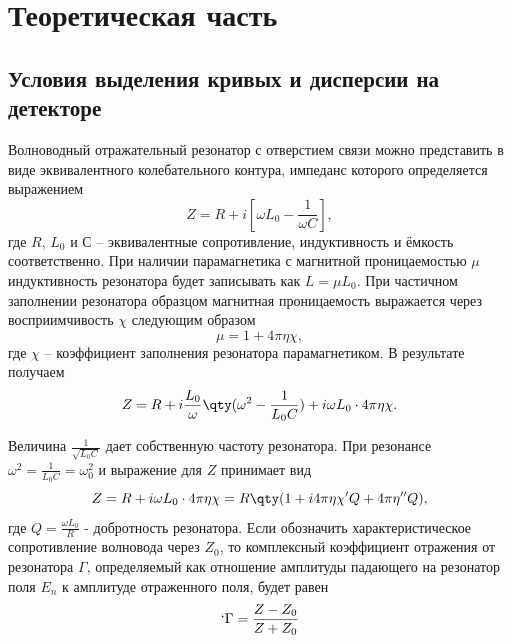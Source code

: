 

\def\labauthors{Виноградов И.Д., Понур К.А., Шиков А.П.}
\def\labgroup{440}
\def\labnumber{1}
\def\labtheme{Исследование твердотельных структур методом ЭПР-спектроскопии}
\def\department{Кафедра квантовой радиофизики и электроники}

\newpage
\section{Теоретическая часть}%
\subsection{Условия выделения кривых и дисперсии на детекторе}%


Волноводный отражательный резонатор с отверстием связи можно представить в виде эквивалентного колебательного контура, импеданс которого определяется выражением
\begin{equation}
    \label{eq:1}
    Z = R + i [ \omega L_{0} - \frac{1}{\omega C}],
\end{equation}
где $R$, $L_{0}$ и $С$ -- эквивалентные сопротивление, индуктивность и ёмкость соответственно. При наличии парамагнетика с магнитной проницаемостью  $\mu$ индуктивность резонатора будет записывать как $L = \mu L_{0}$. При частичном заполнении резонатора образцом магнитная проницаемость выражается через восприимчивость $\chi$ следующим образом
\begin{equation}
    \label{eq:2}
    \mu = 1 + 4 \pi \eta \chi,
\end{equation}
где $\chi$ -- коэффициент заполнения резонатора парамагнетиком. В результате получаем
\begin{equation}
    \label{eq:3}
    Z = R + i \frac{L_{0}}{\omega} \qty( \omega^{2} - \frac{1}{L_{0}C}) + i \omega L_{0} \cdot 4 \pi \eta \chi.
\end{equation} 

Величина $\frac{1}{\sqrt{L_{0} C}}$ дает собственную частоту резонатора. При резонансе $\omega^2 = \frac{1}{L_{0}C} = \omega^2_0$ и выражение для $Z$ принимает вид
\begin{equation}
    \label{eq:4}
    Z = R + i \omega L_{0} \cdot 4 \pi \eta \chi = R \qty( 1 + i 4 \pi \eta \chi' Q + 4 \pi \eta'' Q),
\end{equation}
где $Q = \frac{\omega L_0}{R}$ - добротность резонатора. Если обозначить характеристическое сопротивление волновода через $Z_0$, то комплексный коэффициент отражения от резонатора  $\Gamma$, определяемый как отношение амплитуды падающего на резонатор поля  $E_n$ к амплитуде отраженного поля, будет равен
 \begin{equation}
    \label{eq:5}`
    \Gamma = \frac{Z-Z_{0}}{Z+Z_{0}}
\end{equation}

